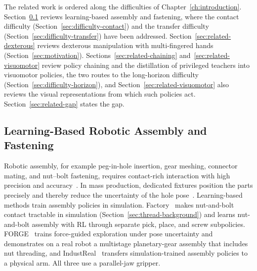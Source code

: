 The related work is ordered along the difficulties of Chapter~\ref{ch:introduction}. Section~\ref{sec:related-assembly} reviews learning-based assembly and fastening, where the contact difficulty (Section~\ref{sec:difficulty-contact}) and the transfer difficulty (Section~\ref{sec:difficulty-transfer}) have been addressed. Section~\ref{sec:related-dexterous} reviews dexterous manipulation with multi-fingered hands (Section~\ref{sec:motivation}). Sections~\ref{sec:related-chaining} and~\ref{sec:related-visuomotor} review policy chaining and the distillation of privileged teachers into visuomotor policies, the two routes to the long-horizon difficulty (Section~\ref{sec:difficulty-horizon}), and Section~\ref{sec:related-visuomotor} also reviews the visual representations from which such policies act. Section~\ref{sec:related-gap} states the gap.

\subsection{Learning-Based Robotic Assembly and Fastening}\label{sec:related-assembly}

Robotic assembly, for example peg-in-hole insertion, gear meshing, connector mating, and nut--bolt fastening, requires contact-rich interaction with high precision and accuracy~\cite{Tang2023industreal}. In mass production, dedicated fixtures position the parts precisely and thereby reduce the uncertainty of the hole pose~\cite{Manyar2023}. Learning-based methods train assembly policies in simulation. Factory~\cite{Narang2022} makes nut-and-bolt contact tractable in simulation (Section~\ref{sec:thread-background}) and learns nut-and-bolt assembly with \ac{RL} through separate pick, place, and screw subpolicies. FORGE~\cite{Noseworthy2025} trains force-guided exploration under pose uncertainty and demonstrates on a real robot a multistage planetary-gear assembly that includes nut threading, and IndustReal~\cite{Tang2023industreal} transfers simulation-trained assembly policies to a physical arm. All three use a parallel-jaw gripper.

